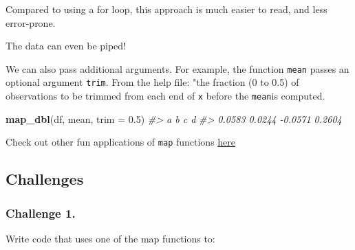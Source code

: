 \documentclass[]{book}
\newenvironment{Shaded}{\begin{snugshade}}{\end{snugshade}}
\newcommand{\CommentTok}[1]{\textcolor[rgb]{0.56,0.35,0.01}{\textit{#1}}}
\newcommand{\DataTypeTok}[1]{\textcolor[rgb]{0.13,0.29,0.53}{#1}}
\newcommand{\FloatTok}[1]{\textcolor[rgb]{0.00,0.00,0.81}{#1}}
\newcommand{\KeywordTok}[1]{\textcolor[rgb]{0.13,0.29,0.53}{\textbf{#1}}}
\newcommand{\NormalTok}[1]{#1}
\newcommand{\OperatorTok}[1]{\textcolor[rgb]{0.81,0.36,0.00}{\textbf{#1}}}
\newcommand{\StringTok}[1]{\textcolor[rgb]{0.31,0.60,0.02}{#1}}
\begin{document}
Compared to using a for loop, this approach is much easier to read, and less error-prone.

The data can even be piped!

\begin{Shaded}
\end{Shaded}

We can also pass additional arguments. For example, the function \texttt{mean} passes an optional argument \texttt{trim}. From the help file: "the fraction (0 to 0.5) of observations to be trimmed from each end of \texttt{x} before the \texttt{mean}is computed.

\begin{Shaded}
\begin{Highlighting}[]
\KeywordTok{map_dbl}\NormalTok{(df, mean, }\DataTypeTok{trim =} \FloatTok{0.5}\NormalTok{)}
\CommentTok{#>       a       b       c       d }
\CommentTok{#>  0.0583  0.0244 -0.0571  0.2604}
\end{Highlighting}
\end{Shaded}

Check out other fun applications of \texttt{map} functions \href{https://r4ds.had.co.nz/iteration.html\#the-map-functions}{here}

\hypertarget{challenges-23}{%
\subsection{Challenges}\label{challenges-23}}

\hypertarget{challenge-1.-12}{%
\subsubsection*{Challenge 1.}\label{challenge-1.-12}}

Write code that uses one of the map functions to:
\end{document}
